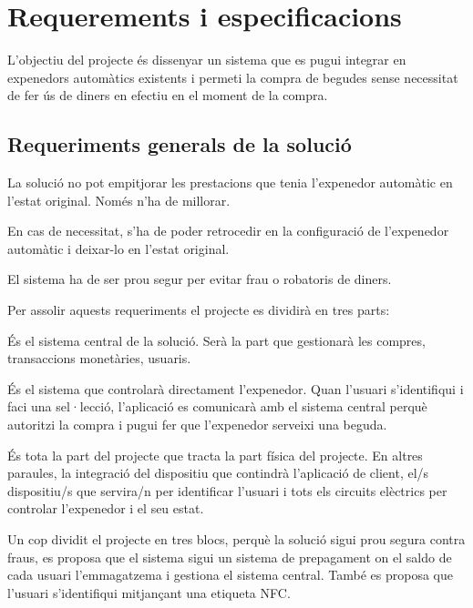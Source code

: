 \chapter{Requerements i especificacions}\label{chapter:requeriments}

L'objectiu del projecte és dissenyar un sistema que es pugui integrar en expenedors automàtics existents i permeti la compra de begudes sense necessitat de fer ús de diners en efectiu en el moment de la compra.

\section{Requeriments generals de la solució}

La solució no pot empitjorar les prestacions que tenia l'expenedor automàtic en l'estat original. Només n'ha de millorar.

En cas de necessitat, s'ha de poder retrocedir en la configuració de l'expenedor automàtic i deixar-lo en l'estat original.

El sistema ha de ser prou segur per evitar frau o robatoris de diners.

Per assolir aquests requeriments el projecte es dividirà en tres parts:
\begin{description}[font=\normalfont\textbf]\itemsep2pt 
\vspace{-1em}
\parskip1pt 
\item [Aplicació de Servidor] És el sistema central de la solució. Serà la part que gestionarà les compres, transaccions monetàries, usuaris.
\item [Aplicació de Client] És el sistema que controlarà directament l'expenedor. Quan l'usuari s'identifiqui i faci una sel·lecció, l'aplicació es comunicarà amb el sistema central perquè autoritzi la compra i pugui fer que l'expenedor serveixi una beguda.
\item [Implementació i integració del hardware] És tota la part del projecte que tracta la part física del projecte. En altres paraules, la integració del dispositiu que contindrà l'aplicació de client, el/s dispositiu/s que servira/n per identificar l'usuari i tots els circuits elèctrics per controlar l'expenedor i el seu estat. 
\vspace{-1em}
\end{description}

Un cop dividit el projecte en tres blocs, perquè la solució sigui prou segura contra fraus, es proposa que el sistema sigui un sistema de prepagament on el saldo de cada usuari l'emmagatzema i gestiona el sistema central. També es proposa que l'usuari s'identifiqui mitjançant una etiqueta NFC.

